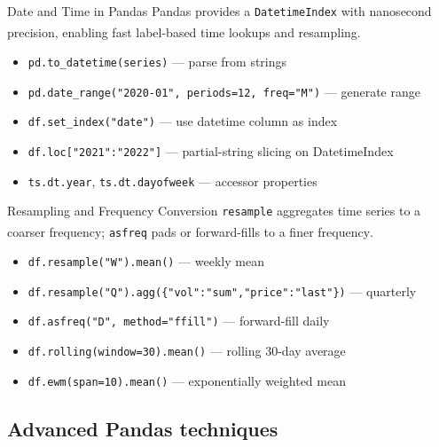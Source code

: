 \begin{v3topic}{Date and Time in Pandas}
    Pandas provides a \texttt{DatetimeIndex} with nanosecond precision, enabling fast label-based time lookups and resampling\textsuperscript{\cite{molinHandsonDataAnalysis2021}}.
\visualseparator
    \begin{itemize}
        \item \texttt{pd.to\_datetime(series)} --- parse from strings
        \item \texttt{pd.date\_range("2020-01", periods=12, freq="M")} --- generate range
        \item \texttt{df.set\_index("date")} --- use datetime column as index
        \item \texttt{df.loc["2021":"2022"]} --- partial-string slicing on DatetimeIndex
        \item \texttt{ts.dt.year}, \texttt{ts.dt.dayofweek} --- accessor properties
    \end{itemize}

\end{v3topic}
\begin{v3topic}{Resampling and Frequency Conversion}
    \texttt{resample} aggregates time series to a coarser frequency; \texttt{asfreq} pads or forward-fills to a finer frequency\textsuperscript{\cite{molinHandsonDataAnalysis2021}}.
\visualseparator
    \begin{itemize}
        \item \texttt{df.resample("W").mean()} --- weekly mean
        \item \texttt{df.resample("Q").agg(\{"vol":"sum","price":"last"\})} --- quarterly
        \item \texttt{df.asfreq("D", method="ffill")} --- forward-fill daily
        \item \texttt{df.rolling(window=30).mean()} --- rolling 30-day average
        \item \texttt{df.ewm(span=10).mean()} --- exponentially weighted mean
    \end{itemize}
\end{v3topic}

\subsection{Advanced Pandas techniques}

